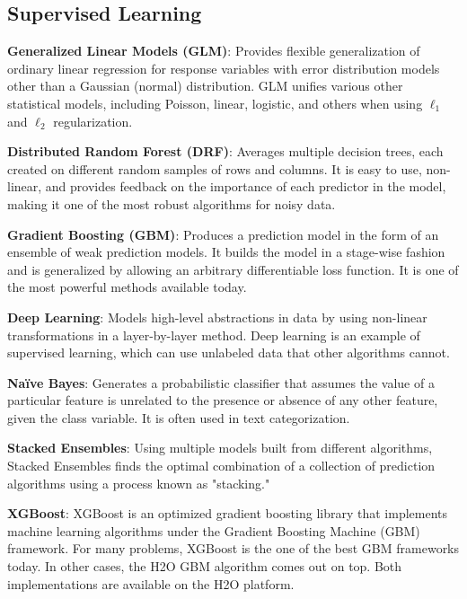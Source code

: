 {{\subsection{Supervised Learning}

{\textbf{Generalized Linear Models (GLM)}}: Provides flexible generalization of ordinary linear regression for response variables with error distribution models other than a Gaussian (normal) distribution. GLM unifies various other statistical models, including Poisson, linear, logistic, and others when using $\ell_1$ and $\ell_2$ regularization.

{\textbf{Distributed Random Forest (DRF)}}: Averages multiple decision trees, each created on different random samples of rows and columns. It is easy to use, non-linear, and provides feedback on the importance of each predictor in the model, making it one of the most robust algorithms for noisy data.

{\textbf{Gradient Boosting (GBM)}}: Produces a prediction model in the form of an ensemble of weak prediction models. It builds the model in a stage-wise fashion and is generalized by allowing an arbitrary differentiable loss function. It is one of the most powerful methods available today.

{\textbf{Deep Learning}}: Models high-level abstractions in data by using non-linear transformations in a layer-by-layer method. Deep learning is an example of supervised learning, which can use unlabeled data that other algorithms cannot.

{\textbf{Na\"{i}ve Bayes}}: Generates a probabilistic classifier that assumes the value of a particular feature is unrelated to the presence or absence of any other feature, given the class variable. It is often used in text categorization.

{\textbf{Stacked Ensembles}}: Using multiple models built from different algorithms, Stacked Ensembles finds the optimal combination of a collection of prediction algorithms using a process known as "stacking."

{\textbf{XGBoost}}: XGBoost is an optimized gradient boosting library that implements machine learning algorithms under the Gradient Boosting Machine (GBM) framework. For many problems, XGBoost is the one of the best GBM frameworks today.  In other cases, the H2O GBM algorithm comes out on top.  Both implementations are available on the H2O platform.

}}
